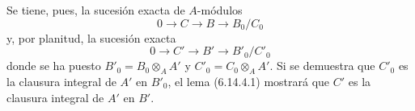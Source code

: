 Se tiene, pues, la sucesión exacta de $A$-módulos
\[
0\longrightarrow C\longrightarrow B\longrightarrow B_0/C_0
\]
y, por planitud, la sucesión exacta
\[
0\longrightarrow C'\longrightarrow B'\longrightarrow B'_0/C'_0
\]
donde se ha puesto $B'_0=B_0\otimes_A A'$ y $C'_0=C_0\otimes_A A'$.
Si se demuestra que $C'_0$ es la clausura integral de $A'$ en $B'_0$,
el lema (6.14.4.1) mostrará que $C'$ es la clausura integral de $A'$
en $B'$.

